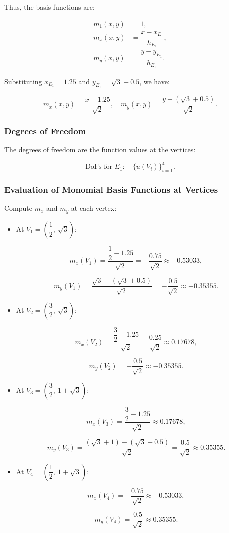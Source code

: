 \documentclass[class=article, crop=false]{standalone}
\begin{document}
Thus, the basis functions are:

\begin{align*}
m_1(x, y) &= 1, \\
m_x(x, y) &= \dfrac{x - x_{E_1}}{h_{E_1}}, \\
m_y(x, y) &= \dfrac{y - y_{E_1}}{h_{E_1}}.
\end{align*}

Substituting \( x_{E_1} = 1.25 \) and \( y_{E_1} = \sqrt{3} + 0.5 \), we have:

\[
m_x(x, y) = \dfrac{x - 1.25}{\sqrt{2}}, \quad m_y(x, y) = \dfrac{y - (\sqrt{3} + 0.5)}{\sqrt{2}}.
\]

\subsubsection{Degrees of Freedom}

The degrees of freedom are the function values at the vertices:

\[
\text{DoFs for } E_1: \quad \{ u(V_i) \}_{i=1}^{4}.
\]

\subsubsection{Evaluation of Monomial Basis Functions at Vertices}

Compute \( m_x \) and \( m_y \) at each vertex:

\begin{itemize}
    \item At \( V_1 = \left( \dfrac{1}{2},\ \sqrt{3} \right) \):

    \[
    m_x(V_1) = \dfrac{\dfrac{1}{2} - 1.25}{\sqrt{2}} = -\dfrac{0.75}{\sqrt{2}} \approx -0.53033,
    \]

    \[
    m_y(V_1) = \dfrac{\sqrt{3} - (\sqrt{3} + 0.5)}{\sqrt{2}} = -\dfrac{0.5}{\sqrt{2}} \approx -0.35355.
    \]

    \item At \( V_2 = \left( \dfrac{3}{2},\ \sqrt{3} \right) \):

    \[
    m_x(V_2) = \dfrac{\dfrac{3}{2} - 1.25}{\sqrt{2}} = \dfrac{0.25}{\sqrt{2}} \approx 0.17678,
    \]

    \[
    m_y(V_2) = -\dfrac{0.5}{\sqrt{2}} \approx -0.35355.
    \]

    \item At \( V_3 = \left( \dfrac{3}{2},\ 1 + \sqrt{3} \right) \):

    \[
    m_x(V_3) = \dfrac{\dfrac{3}{2} - 1.25}{\sqrt{2}} \approx 0.17678,
    \]

    \[
    m_y(V_3) = \dfrac{(\sqrt{3} + 1) - (\sqrt{3} + 0.5)}{\sqrt{2}} = \dfrac{0.5}{\sqrt{2}} \approx 0.35355.
    \]

    \item At \( V_4 = \left( \dfrac{1}{2},\ 1 + \sqrt{3} \right) \):

    \[
    m_x(V_4) = -\dfrac{0.75}{\sqrt{2}} \approx -0.53033,
    \]

    \[
    m_y(V_4) = \dfrac{0.5}{\sqrt{2}} \approx 0.35355.
    \]
\end{itemize}
\end{document}
